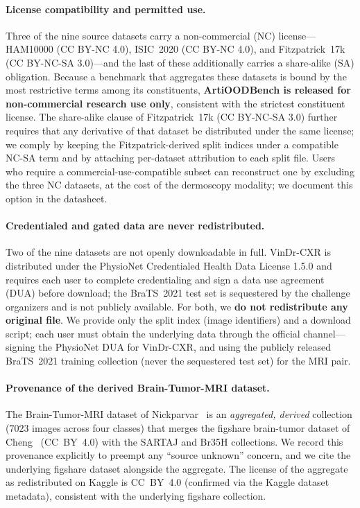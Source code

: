 \documentclass{article}
\begin{document}
\paragraph{License compatibility and permitted use.} Three of the nine source
datasets carry a non-commercial (NC) license---HAM10000 (CC BY-NC 4.0),
ISIC~2020 (CC BY-NC 4.0), and Fitzpatrick~17k (CC BY-NC-SA 3.0)---and the last of
these additionally carries a share-alike (SA) obligation. Because a benchmark
that aggregates these datasets is bound by the most restrictive terms among its
constituents, \textbf{ArtiOODBench is released for non-commercial research use
only}, consistent with the strictest constituent license. The share-alike clause
of Fitzpatrick~17k (CC BY-NC-SA 3.0) further requires that any derivative of that
dataset be distributed under the same license; we comply by keeping the
Fitzpatrick-derived split indices under a compatible NC-SA term and by attaching
per-dataset attribution to each split file. Users who require a
commercial-use-compatible subset can reconstruct one by excluding the three NC
datasets, at the cost of the dermoscopy modality; we document this option in the
datasheet.

\paragraph{Credentialed and gated data are never redistributed.} Two of the nine
datasets are not openly downloadable in full. VinDr-CXR is distributed under the
PhysioNet Credentialed Health Data License 1.5.0 and requires each user to
complete credentialing and sign a data use agreement (DUA) before download; the
BraTS~2021 test set is sequestered by the challenge organizers and is not
publicly available. For both, we \textbf{do not redistribute any original file}.
We provide only the split index (image identifiers) and a download script; each
user must obtain the underlying data through the official channel---signing the
PhysioNet DUA for VinDr-CXR, and using the publicly released BraTS~2021 training
collection (never the sequestered test set) for the MRI pair.

\paragraph{Provenance of the derived Brain-Tumor-MRI dataset.} The
Brain-Tumor-MRI dataset of Nickparvar~\citep{nickparvar2021braintumormri} is an
\emph{aggregated, derived} collection ($7023$ images across four classes) that
merges the figshare brain-tumor dataset of Cheng~\citep{cheng2015braintumor}
(CC~BY~4.0) with the SARTAJ and Br35H collections. We record this provenance
explicitly to preempt any ``source unknown'' concern, and we cite the underlying
figshare dataset alongside the aggregate. The license of the aggregate as
redistributed on Kaggle is CC~BY~4.0 (confirmed via the Kaggle dataset metadata),
consistent with the underlying figshare collection.
\end{document}
